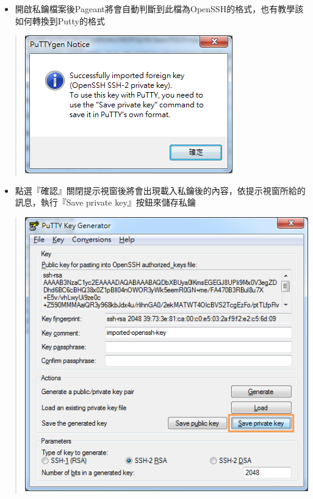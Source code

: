 \documentclass[letterpaper,10pt,english]{sphinxmanual}
\begin{document}
\begin{itemize}
\item {} 
開啟私鑰檔案後Pageant將會自動判斷到此檔為OpenSSH的格式，也有教學該如何轉換到Putty的格式

\end{itemize}
\begin{quote}

\includegraphics{openssh-putty-005.png}
\end{quote}
\begin{itemize}
\item {} 
點選『確認』關閉提示視窗後將會出現載入私鑰後的內容，依提示視窗所給的訊息，執行『Save private key』按鈕來儲存私鑰

\end{itemize}
\begin{quote}

\includegraphics{openssh-putty-006.png}
\end{quote}
\end{document}
